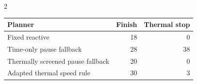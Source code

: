 \documentclass{ieeeaccess}
\makeatletter
\newenvironment{appendixdisplay}[1]
  {\par\addvspace{4pt}\noindent\begin{minipage}{\linewidth}\def\@captype{#1}}
  {\end{minipage}\par\addvspace{6pt}}
\makeatother
\begin{document}
\begin{multicols}{2}
\begin{appendixdisplay}{table}
\caption{Earlier planner comparison over 72 starts per method}
\label{tab:earlier-planners}
\centering
\footnotesize
\renewcommand{\arraystretch}{1.13}
\begin{tabular*}{\linewidth}{@{\extracolsep{\fill}}lrr@{}}
\hline
Planner & Finish & Thermal stop \\
\hline
Fixed reactive & 18 & 0 \\
Time-only pause fallback & 28 & 38 \\
Thermally screened pause fallback & 20 & 0 \\
Adapted thermal speed rule & 30 & 3 \\
\hline
\end{tabular*}
\end{appendixdisplay}

\end{multicols}
\end{document}
